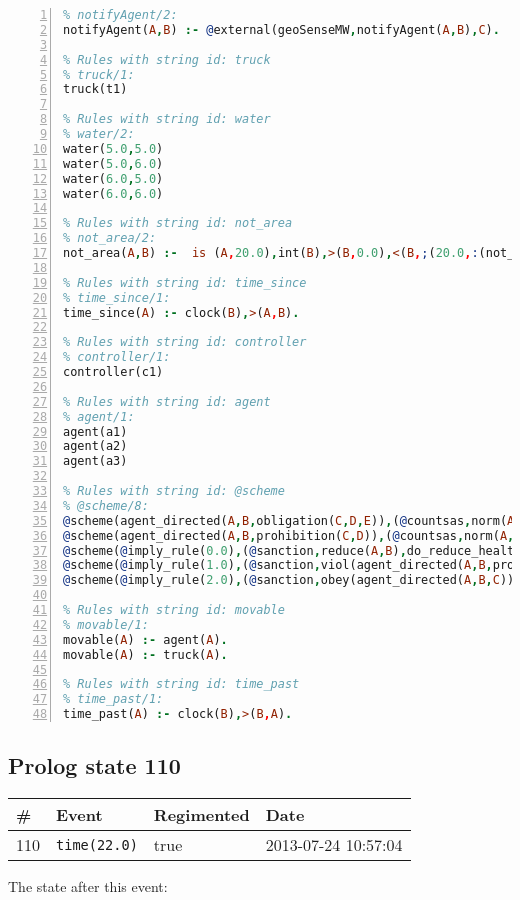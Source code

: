 \documentclass[11pt]{article}\usepackage[utf8]{inputenc}\usepackage{geometry}
\begin{document}
\begin{lstlisting}[language=Prolog, numbers=left]
% Rules with string id: notifyAgent
% notifyAgent/2:
notifyAgent(A,B) :- @external(geoSenseMW,notifyAgent(A,B),C).

% Rules with string id: truck
% truck/1:
truck(t1)

% Rules with string id: water
% water/2:
water(5.0,5.0)
water(5.0,6.0)
water(6.0,5.0)
water(6.0,6.0)

% Rules with string id: not_area
% not_area/2:
not_area(A,B) :-  is (A,20.0),int(B),>(B,0.0),<(B,;(20.0,:(not_area(A,B), is (-(B),20.0)))),int(A),>(A,0.0),<(A,;(20.0,:(area(A,B),-(int(A))))),int(B),>(A,0.0),>(B,0.0),<(A,21.0),<(B,21.0).

% Rules with string id: time_since
% time_since/1:
time_since(A) :- clock(B),>(A,B).

% Rules with string id: controller
% controller/1:
controller(c1)

% Rules with string id: agent
% agent/1:
agent(a1)
agent(a2)
agent(a3)

% Rules with string id: @scheme
% @scheme/8:
@scheme(agent_directed(A,B,obligation(C,D,E)),(@countsas,norm(A,B,F,obligation(C,D,E)),F),false,(listTrue(C)),(time_past(D)),false,[plus(viol(agent_directed(A,B,obligation(C,D,E))))|[]],[plus(obey(agent_directed(A,B,obligation(C,D,E))))|[]])
@scheme(agent_directed(A,B,prohibition(C,D)),(@countsas,norm(A,B,E,prohibition(C,D)),E),(listTrue(C)),false,(false),false,[plus(viol(agent_directed(A,B,prohibition(C,D))))|[]],[plus(obey(agent_directed(A,B,prohibition(C,D))))|[]])
@scheme(@imply_rule(0.0),(@sanction,reduce(A,B),do_reduce_health(A,B),notifyAgent(A,changed(status))),true,false,false,false,[min(reduce(A,B))|[]],[])
@scheme(@imply_rule(1.0),(@sanction,viol(agent_directed(A,B,prohibition(C,D))),do_sanction(D)),true,false,false,false,[min(viol(agent_directed(A,B,prohibition(C,D))))|[]],[])
@scheme(@imply_rule(2.0),(@sanction,obey(agent_directed(A,B,C))),true,false,false,false,[min(obey(agent_directed(A,B,C)))|[]],[])

% Rules with string id: movable
% movable/1:
movable(A) :- agent(A).
movable(A) :- truck(A).

% Rules with string id: time_past
% time_past/1:
time_past(A) :- clock(B),>(B,A).

\end{lstlisting}
\clearpage 
\subsection{Prolog state 110}
\begin{table}[ht]
\centering 
\begin{tabular}{l l l l} 
\textbf{\#} & \textbf{Event} & \textbf{Regimented} & \textbf{Date} \\ [0.5ex] 
\hline
110&\texttt{time(22.0)}&true&2013-07-24 10:57:04\\ [1ex] \hline\end{tabular}
\end{table}
The state after this event:
\end{document}
